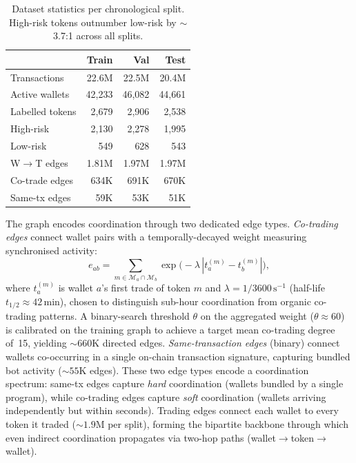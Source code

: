 \documentclass[10pt,journal]{IEEEtran}
\begin{document}
\begin{table}[t]
\caption{Dataset statistics per chronological split. High-risk tokens
outnumber low-risk by ${\sim}$3.7{:}1 across all splits.}
\label{tab:data}
\centering\small
\begin{tabular}{lrrr}
\toprule
& Train & Val & Test \\
\midrule
Transactions       & 22.6M  & 22.5M  & 20.4M \\
Active wallets     & 42,233 & 46,082 & 44,661 \\
Labelled tokens    & 2,679  & 2,906  & 2,538 \\
\quad High-risk    & 2,130  & 2,278  & 1,995 \\
\quad Low-risk     & 549    & 628    & 543   \\
W$\to$T edges      & 1.81M  & 1.97M  & 1.97M \\
Co-trade edges     & 634K   & 691K   & 670K  \\
Same-tx edges      & 59K    & 53K    & 51K   \\
\bottomrule
\end{tabular}
\end{table}

The graph encodes coordination through two dedicated edge types.
\emph{Co-trading edges} connect wallet pairs with a temporally-decayed
weight measuring synchronised activity:
\begin{equation}
  e_{ab} = \!\sum_{m \in \mathcal{M}_a \cap \mathcal{M}_b}\!
    \exp\!\bigl(-\lambda\,|t_a^{(m)} - t_b^{(m)}|\bigr),
  \label{eq:cotrade}
\end{equation}
where $t_a^{(m)}$ is wallet $a$'s first trade of token $m$ and
$\lambda{=}1/3600\,\text{s}^{-1}$ (half-life
$t_{1/2}{\approx}42\,\text{min}$), chosen to distinguish sub-hour
coordination from organic co-trading patterns.
A binary-search threshold $\theta$ on the aggregated weight
($\theta{\approx}60$) is calibrated on the training graph to achieve a
target mean co-trading degree of~15, yielding
${\sim}660$K directed edges. \emph{Same-transaction edges} (binary)
connect wallets co-occurring in a single on-chain transaction
signature, capturing bundled bot activity (${\sim}55$K edges). These two edge types encode a coordination spectrum: same-tx edges
capture \emph{hard} coordination (wallets bundled by a single
program), while co-trading edges capture \emph{soft} coordination
(wallets arriving independently but within seconds). Trading
edges connect each wallet to every token it traded (${\sim}1.9$M per
split), forming the bipartite backbone through which even indirect
coordination propagates via two-hop paths
(wallet$\to$token$\to$wallet).
\end{document}
